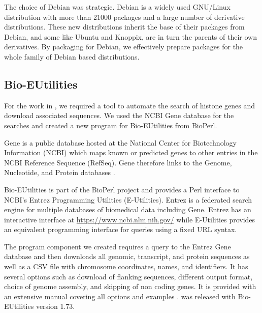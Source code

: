 
The choice of Debian was strategic.  Debian is a widely used GNU/Linux
distribution with more than 21000 packages and a large
number of derivative distributions.  These new distributions
inherit the base of their packages from Debian, and some like Ubuntu
and Knoppix, are in turn the parents of their own derivatives.  By packaging
for Debian, we effectively prepare packages for the whole family of
Debian based distributions.

\subsection{Bio-EUtilities}

For the work in , we required a tool to
automate the search of histone genes and download associated sequences.
We used the NCBI Gene database for the searches and
created a new program for Bio-EUtilities from BioPerl.

Gene is a public database hosted at the National Center for
Biotechnology Information (NCBI) which maps known or predicted genes
to other entries in the NCBI Reference Sequence (RefSeq).  Gene therefore
links to the Genome, Nucleotide, and Protein databases \citep{gene-database}.

Bio-EUtilities is part of the BioPerl project and provides a Perl
interface to NCBI's Entrez Programming Utilities (E-Utilities).
Entrez is a federated search engine for multiple databases of
biomedical data including Gene.  Entrez has an
interactive interface at \url{https://www.ncbi.nlm.nih.gov/} while
E-Utilities provides an equivalent
programming interface for queries using a fixed
URL syntax.

The program  component we
created requires a query to the Entrez Gene database and
then downloads all genomic, transcript, and protein sequences as well
as a CSV file with chromosome coordinates, names, and identifiers.  It
has several options such as download of flanking sequences, different
output format, choice of genome assembly, and skipping of non coding
genes.  It is provided with an extensive manual covering all options
and examples .
 was released with
Bio-EUtilities version 1.73.

